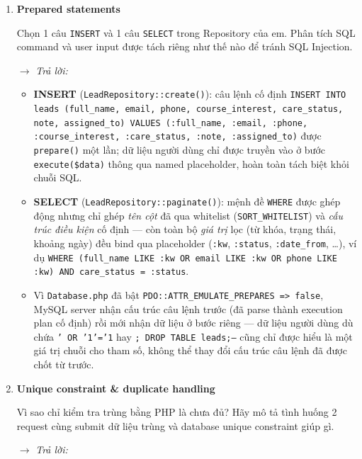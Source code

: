 \begin{enumerate}[label = \textbf{\arabic*.}, leftmargin=*]
    \item \textbf{Prepared statements}

    Chọn 1 câu \texttt{INSERT} và 1 câu \texttt{SELECT} trong Repository của em. Phân tích SQL command và user input được tách riêng như thế nào để tránh SQL Injection.

    \hspace*{-0.6cm} $\rightarrow$ \textit{Trả lời:}

    \begin{itemize}[leftmargin = 0.55cm, label = $\bullet$]
        \item \textbf{INSERT} (\texttt{LeadRepository::create()}): câu lệnh cố định \texttt{INSERT INTO leads (full\_name, email, phone, course\_interest, care\_status, note, assigned\_to) VALUES (:full\_name, :email, :phone, :course\_interest, :care\_status, :note, :assigned\_to)} được \texttt{prepare()} một lần; dữ liệu người dùng chỉ được truyền vào ở bước \texttt{execute(\$data)} thông qua named placeholder, hoàn toàn tách biệt khỏi chuỗi SQL.
        \item \textbf{SELECT} (\texttt{LeadRepository::paginate()}): mệnh đề \texttt{WHERE} được ghép động nhưng chỉ ghép \emph{tên cột} đã qua whitelist (\texttt{SORT\_WHITELIST}) và \emph{cấu trúc điều kiện} cố định — còn toàn bộ \emph{giá trị} lọc (từ khóa, trạng thái, khoảng ngày) đều bind qua placeholder (\texttt{:kw}, \texttt{:status}, \texttt{:date\_from}, \ldots), ví dụ \texttt{WHERE (full\_name LIKE :kw OR email LIKE :kw OR phone LIKE :kw) AND care\_status = :status}.
        \item Vì \texttt{Database.php} đã bật \texttt{PDO::ATTR\_EMULATE\_PREPARES => false}, MySQL server nhận cấu trúc câu lệnh trước (đã parse thành execution plan cố định) rồi mới nhận dữ liệu ở bước riêng — dữ liệu người dùng dù chứa \texttt{' OR '1'='1} hay \texttt{; DROP TABLE leads;--} cũng chỉ được hiểu là một giá trị chuỗi cho tham số, không thể thay đổi cấu trúc câu lệnh đã được chốt từ trước.
    \end{itemize}

    \item \textbf{Unique constraint \& duplicate handling}

    Vì sao chỉ kiểm tra trùng bằng PHP là chưa đủ? Hãy mô tả tình huống 2 request cùng submit dữ liệu trùng và database unique constraint giúp gì.

    \hspace*{-0.6cm} $\rightarrow$ \textit{Trả lời:}


\end{enumerate}
